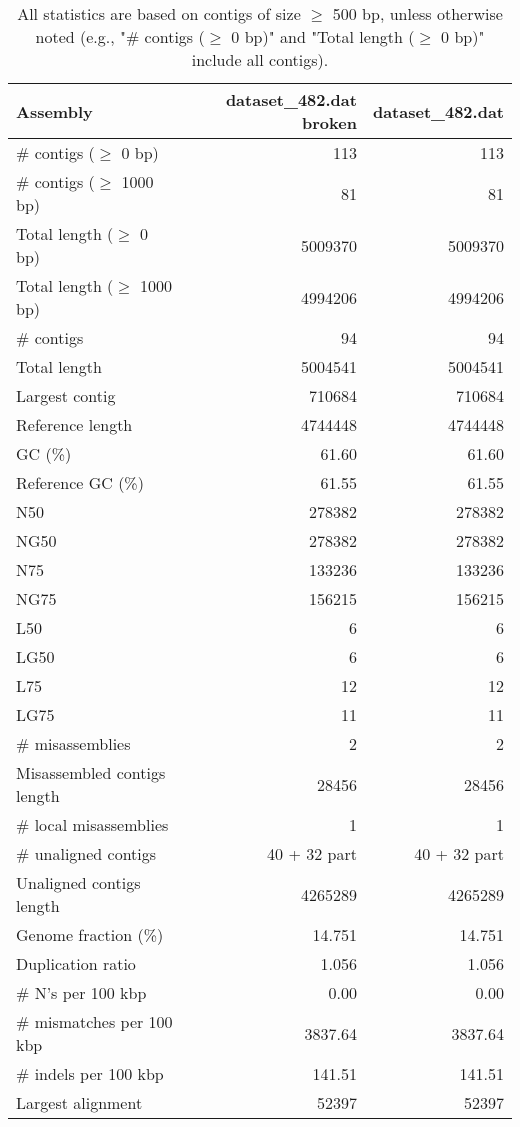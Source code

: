 \documentclass[12pt,a4paper]{article}
\begin{document}
\begin{table}[ht]
\begin{center}
\caption{All statistics are based on contigs of size $\geq$ 500 bp, unless otherwise noted (e.g., "\# contigs ($\geq$ 0 bp)" and "Total length ($\geq$ 0 bp)" include all contigs).}
\begin{tabular}{|l*{2}{|r}|}
\hline
Assembly & dataset\_482.dat broken & dataset\_482.dat \\ \hline
\# contigs ($\geq$ 0 bp) & 113 & 113 \\ \hline
\# contigs ($\geq$ 1000 bp) & 81 & 81 \\ \hline
Total length ($\geq$ 0 bp) & 5009370 & 5009370 \\ \hline
Total length ($\geq$ 1000 bp) & 4994206 & 4994206 \\ \hline
\# contigs & 94 & 94 \\ \hline
Total length & 5004541 & 5004541 \\ \hline
Largest contig & 710684 & 710684 \\ \hline
Reference length & 4744448 & 4744448 \\ \hline
GC (\%) & 61.60 & 61.60 \\ \hline
Reference GC (\%) & 61.55 & 61.55 \\ \hline
N50 & 278382 & 278382 \\ \hline
NG50 & 278382 & 278382 \\ \hline
N75 & 133236 & 133236 \\ \hline
NG75 & 156215 & 156215 \\ \hline
L50 & 6 & 6 \\ \hline
LG50 & 6 & 6 \\ \hline
L75 & 12 & 12 \\ \hline
LG75 & 11 & 11 \\ \hline
\# misassemblies & 2 & 2 \\ \hline
Misassembled contigs length & 28456 & 28456 \\ \hline
\# local misassemblies & 1 & 1 \\ \hline
\# unaligned contigs & 40 + 32 part & 40 + 32 part \\ \hline
Unaligned contigs length & 4265289 & 4265289 \\ \hline
Genome fraction (\%) & 14.751 & 14.751 \\ \hline
Duplication ratio & 1.056 & 1.056 \\ \hline
\# N's per 100 kbp & 0.00 & 0.00 \\ \hline
\# mismatches per 100 kbp & 3837.64 & 3837.64 \\ \hline
\# indels per 100 kbp & 141.51 & 141.51 \\ \hline
Largest alignment & 52397 & 52397 \\ \hline
\end{tabular}
\end{center}
\end{table}
\end{document}
